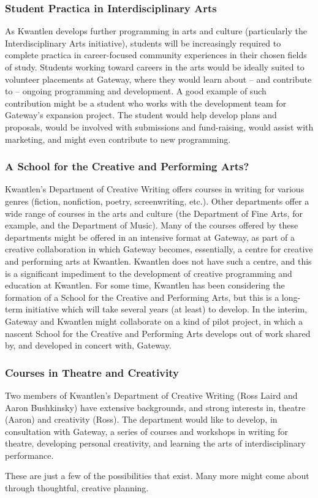 \documentclass[12pt,DIV10,oneside,headsepline,letterpaper]{scrreprt}
\begin{document}
\subsubsection{Student Practica in Interdisciplinary Arts}

As Kwantlen develops further programming in arts and culture (particularly the Interdisciplinary Arts initiative), students will be increasingly required to complete practica in career-focused community experiences in their chosen fields of study. Students working toward careers in the arts would be ideally suited to volunteer placements at Gateway, where they would learn about -- and contribute to -- ongoing programming and development. A good example of such contribution might be a student who works with the development team for Gateway's expansion project. The student would help develop plans and proposals, would be involved with submissions and fund-raising, would assist with marketing, and might even contribute to new programming.

\subsubsection{A School for the Creative and Performing Arts?}

Kwantlen's Department of Creative Writing offers courses in writing for various genres (fiction, nonfiction, poetry, screenwriting, etc.). Other departments offer a wide range of courses in the arts and culture (the Department of Fine Arts, for example, and the Department of Music). Many of the courses offered by these departments might be offered in an intensive format at Gateway, as part of a creative collaboration in which Gateway becomes, essentially, a centre for creative and performing arts at Kwantlen. Kwantlen does not have such a centre, and this is a significant impediment to the development of creative programming and education at Kwantlen. For some time, Kwantlen has been considering the formation of a School for the Creative and Performing Arts, but this is a long-term initiative which will take several years (at least) to develop. In the interim, Gateway and Kwantlen might collaborate on a kind of pilot project, in which a nascent School for the Creative and Performing Arts develops out of work shared by, and developed in concert with, Gateway.

\subsubsection{Courses in Theatre and Creativity}

Two members of Kwantlen's Department of Creative Writing (Ross Laird and Aaron Bushkinsky) have extensive backgrounds, and strong interests in, theatre (Aaron) and creativity (Ross). The department would like to develop, in consultation with Gateway, a series of courses and workshops in writing for theatre, developing personal creativity, and learning the arts of interdisciplinary performance.

\bigskip
\textsection
\bigskip

These are just a few of the possibilities that exist. Many more might come about through thoughtful, creative planning.
\end{document}

